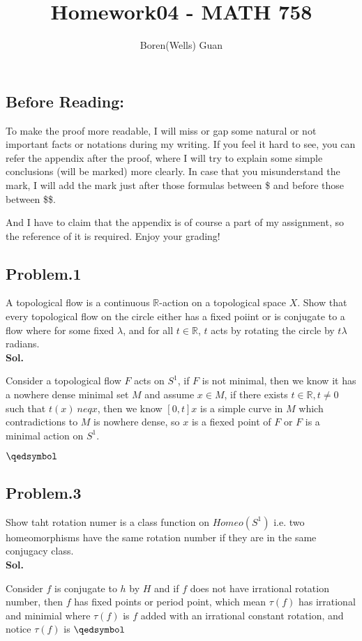 \documentclass[lang=en,11pt,a4paper,citestyle =authoryear]{elegantpaper}
\title{Homework04 - MATH 758}
\author{Boren(Wells) Guan}
\newcommand{\prvd}{$\hfill \qedsymbol$}
\newcommand{\R}{\mathbb{R}}
\begin{document}
\maketitle

\subsection*{Before Reading:}\par
To make the proof more readable, I will miss or gap some natural or not important facts or notations during my writing. If you feel it hard to see, you can refer the appendix after the proof, where I will try to explain some simple conclusions (will be marked) more clearly. In case that you misunderstand the mark, I will add the mark just after those formulas between \$ and before those between \$\$.\par
And I have to claim that the appendix is of course a part of my assignment, so the reference of it is required. Enjoy your grading!

\subsection*{Problem.1} 
A topological flow is a continuous $\R$-action on a topological space $X$. Show that every topological flow on the circle either has a fixed poiint or is conjugate to a flow where for some fixed $\lambda$, and for all $t\in \R$, $t$ acts by rotating the circle by $t\lambda$ radians.
\vspace{0.5em}\\
\textbf{Sol.} \par
Consider a topological flow $F$ acts on $S^1$, if $F$ is not minimal, then we know it has a nowhere dense minimal set $M$ and assume $x\in M$, if there exists $t\in \R, t\neq 0$ such that $t(x)\ neq x$, then we know $[0,t]x$ is a simple curve in $M$ which contradictions to $M$ is nowhere dense, so $x$ is a fiexed point of $F$ or $F$ is a minimal action on $S^1$.\par

\prvd
\vspace{0.5em}

\subsection*{Problem.3} 
Show taht rotation numer is a class function on $Homeo(S^1)$ i.e. two homeomorphisms have the same rotation number if they are in the same conjugacy class.
\vspace{0.5em}\\
\textbf{Sol.} \par
    Consider $f$ is conjugate to $h$ by $H$ and if $f$ does not have irrational rotation number, then $f$ has fixed points or period point, which mean $\tau(f)$ has irrational and minimial where $\tau(f)$ is $f$ added with an irrational constant rotation, and notice $\tau(f)$ is 
\prvd
\vspace{0.5em}
\end{document}
